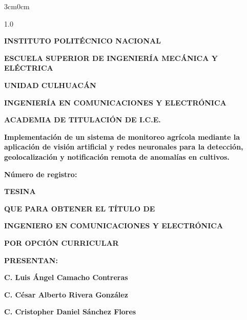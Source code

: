 \begin{titlepage}
\begin{adjustwidth}{3cm}{0cm} 
    \centering
    \begin{spacing}{1.0}
    {\Large \bfseries \MakeUppercase{Instituto Politécnico Nacional}\par}
    \par
    {\normalsize \bfseries \MakeUppercase{Escuela Superior de Ingeniería Mecánica y Eléctrica}\par}
    \vspace{0.3cm}
    {\normalsize \bfseries \MakeUppercase{Unidad Culhuacán}\par}
    {\normalsize \bfseries \MakeUppercase{Ingeniería en Comunicaciones y Electrónica}\par}
    {\normalsize \bfseries \MakeUppercase{Academia de Titulación de I.C.E.}\par}
    \vspace{0.5cm}
    {\Large \bfseries Implementación de un sistema de monitoreo agrícola mediante la aplicación de visión artificial y redes neuronales para la detección, geolocalización y notificación remota de anomalías en cultivos.\par}
    \vspace{0.5cm}
    {\normalsize \bfseries Número de registro: \par}
    \vspace{0.5cm}
    {\normalsize \bfseries \MakeUppercase{Tesina}\par}
    \vspace{0.1cm}
    {\normalsize \bfseries \MakeUppercase{Que para obtener el título de}\par}
    {\normalsize \bfseries \MakeUppercase{Ingeniero en Comunicaciones y Electrónica}\par}
    {\normalsize \bfseries \MakeUppercase{Por Opción Curricular}\par}
    \vspace{0.5cm}
    {\normalsize \bfseries \MakeUppercase{Presentan:}\par}
    \vspace{0.1cm}
    {\normalsize \bfseries C. Luis Ángel Camacho Contreras\par}
    {\normalsize \bfseries C. César Alberto Rivera González\par}
    {\normalsize \bfseries C. Cristopher Daniel Sánchez Flores\par}

\end{spacing}
\end{adjustwidth}
\end{titlepage}
